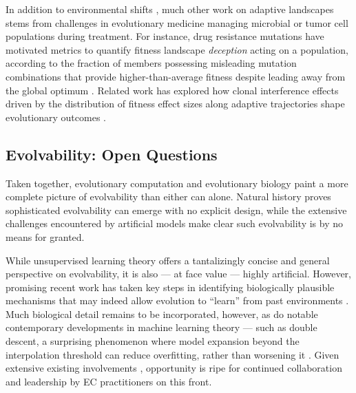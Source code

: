 In addition to environmental shifts \citep{king2025fitness,gatenby2020integrating,acar2020exploiting,goulart2013designing}, much other work on adaptive landscapes stems from challenges in evolutionary medicine managing microbial or tumor cell populations during treatment.
For instance, drug resistance mutations have motivated metrics to quantify fitness landscape \textit{deception} acting on a population, according to the fraction of members possessing misleading mutation combinations that provide higher-than-average fitness despite leading away from the global optimum \citep{eppstein2016quantifying}.
Related work has explored how clonal interference effects driven by the distribution of fitness effect sizes along adaptive trajectories shape evolutionary outcomes \citep{ogbunugafor2016competition}.

\subsection{Evolvability: Open Questions}

Taken together, evolutionary computation and evolutionary biology paint a more complete picture of evolvability than either can alone.
Natural history proves sophisticated evolvability can emerge with no explicit design, while the extensive challenges encountered by artificial models make clear such evolvability is by no means for granted.

While unsupervised learning theory offers a tantalizingly concise and general perspective on evolvability, it is also --- at face value --- highly artificial.
However, promising recent work has taken key steps in identifying biologically plausible mechanisms that may indeed allow evolution to ``learn'' from past environments \citep{kouvaris2017evolution,watson2016how,watson2014evolution}.
Much biological detail remains to be incorporated, however, as do notable contemporary developments in machine learning theory --- such as double descent, a surprising phenomenon where model expansion beyond the interpolation threshold can reduce overfitting, rather than worsening it \citep{belkin2019reconciling,rocks2022memorizing,nakkiran2021deep}.
Given extensive existing involvements \citep{kouvaris2017evolution,szilagyi2020phenotypes,mitchell2025genomic,watson2016how,watson2014evolution}, opportunity is ripe for continued collaboration and leadership by EC practitioners on this front.

